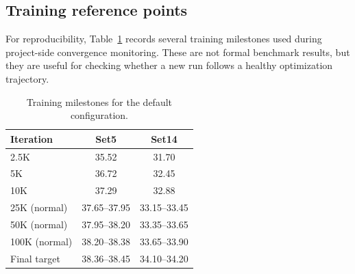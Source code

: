\subsection{Training reference points}
For reproducibility, Table~\ref{tab:milestones} records several training milestones used during project-side convergence monitoring. These are not formal benchmark results, but they are useful for checking whether a new run follows a healthy optimization trajectory.

\begin{table}[t]
\centering
\caption{Training milestones for the default \method{} configuration.}
\label{tab:milestones}
\begin{tabular}{lcc}
\toprule
Iteration & Set5 & Set14 \\
\midrule
2.5K & 35.52 & 31.70 \\
5K & 36.72 & 32.45 \\
10K & 37.29 & 32.88 \\
25K (normal) & 37.65--37.95 & 33.15--33.45 \\
50K (normal) & 37.95--38.20 & 33.35--33.65 \\
100K (normal) & 38.20--38.38 & 33.65--33.90 \\
Final target & 38.36--38.45 & 34.10--34.20 \\
\bottomrule
\end{tabular}
\end{table}
